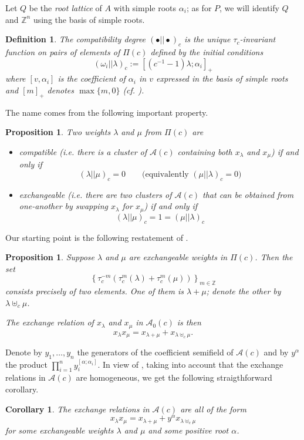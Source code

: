 \documentclass[11pt]{amsart}
\newcommand{\cA}{\mathcal{A}}
\newcommand{\ZZ}{\mathbb{Z}}
\newtheorem{corollary}[theorem]{Corollary}
\newtheorem{definition}[theorem]{Definition}
\newtheorem{proposition}[theorem]{Proposition}
\numberwithin{equation}{section}
\begin{document}
  Let $Q$ be the \emph{root lattice} of $A$ with simple roots $\alpha_i$; as for $P$, we will identify $Q$ and $\ZZ^n$ using the basis of simple roots.
  \begin{definition}
    The \emph{compatibility degree} $(\bullet||\bullet)_c$ is the unique $\tau_c$-invariant function on pairs of elements of $\Pi(c)$ defined by the initial conditions
    \[
      (\omega_i||\lambda)_c
      :=
      \left[ (c^{-1}-1)\lambda ; \alpha_i\right]_+
    \]
    where $[v,\alpha_i]$ is the coefficient of $\alpha_i$ in $v$ expressed in the basis of simple roots and $[m]_+$  denotes $\max\{m, 0\}$ (cf. \cite[Proposition 5.1]{YZ08}).
  \end{definition}
  The name comes from the following important property.
  \begin{proposition}
    Two weights $\lambda$ and $\mu$ from $\Pi(c)$ are
    \begin{itemize}
      \item
        \emph{compatible} (i.e. there is a cluster of $\cA(c)$ containing both $x_\lambda$ and $x_\mu$) if and only if
        \[
          (\lambda||\mu)_c = 0
          \quad \quad
          \text{(equivalently $(\mu||\lambda)_c=0$)}
        \]

      \item
        \emph{exchangeable} (i.e. there are two clusters of $\cA(c)$ that can be obtained from one-another by swapping $x_\lambda$ for $x_\mu$) if and only if
        \[
          (\lambda||\mu)_c = 1 = (\mu||\lambda)_c
        \]
    \end{itemize}
  \end{proposition}

  Our starting point is the following restatement of \cite[Propositions 5.1 and 5.2]{Ste13}. 
  \begin{proposition}
    Suppose $\lambda$ and $\mu$ are exchangeable weights in $\Pi(c)$. 
    Then the set
    \[
      \left\{
        \tau_c^{-m}\left(\tau_c^m(\lambda)+\tau_c^m(\mu)\right)
      \right\}_{m\in\ZZ}
    \]
    consists precisely of two elements. One of them is $\lambda+\mu$; denote the other by $\lambda\uplus_c\mu$.

    The exchange relation of $x_\lambda$ and $x_\mu$ in $\cA_0(c)$ is then
    \[
      x_\lambda x_\mu = x_{\lambda+\mu} + x_{\lambda\uplus_c\mu}.
    \]
  \end{proposition}

  Denote by $y_1,\dots,y_n$ the generators of the coefficient semifield of $\cA(c)$ and by $y^\alpha$ the product $\prod_{i=1}^n y_i^{[\alpha;\alpha_i]}$.
  In view of \cite{NS14}, taking into account that the exchange relations in $\cA(c)$ are homogeneous, we get the following straigthforward corollary.
  \begin{corollary}
    The exchange relations in $\cA(c)$ are all of the form 
    \[
      x_\lambda x_\mu = x_{\lambda+\mu} + y^\alpha x_{\lambda\uplus_c\mu}
    \]
    for some exchangeable weights $\lambda$ and $\mu$ and some positive root $\alpha$.
  \end{corollary}
\end{document}
